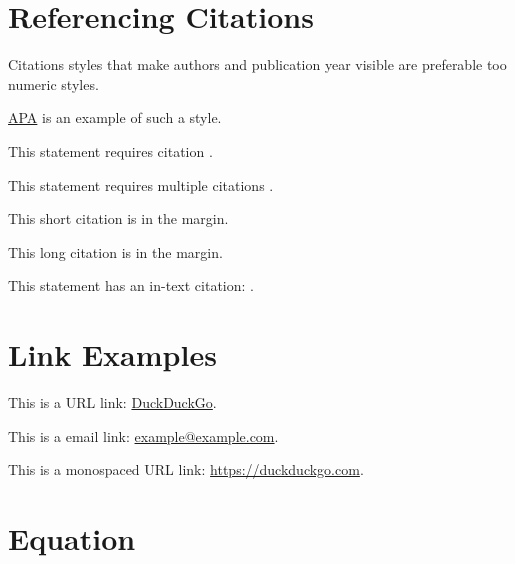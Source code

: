 \documentclass[
	a4paper, %
	11pt, %
]{DC_Report}
\begin{document}

\section{Referencing Citations}

Citations styles that make authors and publication year visible are preferable too numeric styles. 

 \href{https://owl.purdue.edu/owl/research_and_citation/apa_style/apa_formatting_and_style_guide/index.html}{APA} is an example of such a style.

This statement requires citation \autocite{borrmann_building_2021}.

This statement requires multiple citations \autocite{Schulz:959998}.

This short citation is in the margin.

This long citation is in the margin.

This statement has an in-text citation: \textcite{Kremer:862313}.


\section{Link Examples}

This is a URL link: \href{https://www.duckduckgo.com}{DuckDuckGo}.

This is a email link: \href{mailto:example@example.com}{example@example.com}.

This is a monospaced URL link: \url{https://duckduckgo.com}.


\section{Equation}
\end{document}
